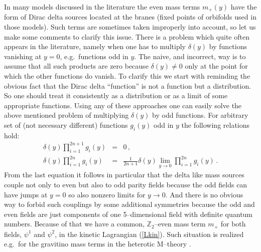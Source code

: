 \documentclass[a4paper,12pt]{article}
\def\de{\delta}
\def\ZZ{\mathbb Z}
\begin{document}
In many models discussed in the literature the even mass terms
$m_+(y)$ have the form of Dirac delta sources located at the branes
(fixed points of orbifolds used in those models). Such terms are
sometimes taken improperly into account, so let us make some
comments to clarify this issue. There is a problem which quite often
appears in the literature, namely  when one has to multiply $\de(y)$
by functions vanishing at $y=0$, e.g.\ functions odd in $y$. 
The naive, and incorrect, way is to
assume that all such products are zero because $\de(y)\ne0$ only at
the point for which the other functions do vanish. To clarify this 
we start with reminding the obvious fact that the Dirac delta
``function'' is not a function but a distribution. So one 
should treat it consistently as a distribution or as a limit of some
appropriate functions. Using any of these approaches one can easily
solve the above mentioned problem of multiplying $\de(y)$ by odd
functions. For arbitrary set of (not necessary different) functions
$g_i(y)$ odd in $y$ the following relations hold:
\begin{eqnarray}
\de(y)\prod_{i=1}^{2n+1}g_i(y)
&\!\!\!=\!\!\!&
0
\,,
\\[6pt]
\de(y)\prod_{i=1}^{2n}g_i(y)
&\!\!\!=\!\!\!&
\frac{1}{2n+1}\de(y)\lim_{y\to0}\prod_{i=1}^{2n}g_i(y)
\,.
\end{eqnarray}
From the last equation it follows in particular that the delta like
mass sources couple not only to even but also to odd parity fields
because the odd fields can have jumps at $y=0$ so also nonzero limits
for $y\to0$. And there is no obvious way to forbid such couplings by
some additional symmetries because the odd and even fields are just
components of one 5--dimensional field with definite quantum
numbers.
Because of that we have a common, $\ZZ_2$--even mass term $m_+$ for
both fields, $\psi^1$ and $\psi^2$, in the kinetic Lagrangian
(\ref{Lkin}). Such situation is realized e.g.\ for the gravitino mass
terms in the heterotic M--theory \cite{Meissner:1999ja}.
\end{document}
